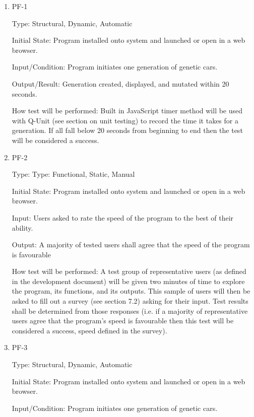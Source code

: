 \documentclass[12pt, titlepage]{article}
\begin{document}
\begin{enumerate}

\item{PF-1\\}

Type: Structural, Dynamic, Automatic
					
Initial State: Program installed onto system and launched or open in a web 
browser.
					
Input/Condition: Program initiates one generation of genetic cars.
					
Output/Result: Generation created, displayed, and mutated within 20 seconds.
					
How test will be performed: Built in JavaScript timer method will be used with 
Q-Unit (see section on unit testing) to record the time it takes for a
generation. If all fall below 20 seconds from beginning to end then the test 
will be considered a success.


\item{PF-2\\}

Type: Type: Functional, Static, Manual
					
Initial State: Program installed onto system and launched or open in a web 
browser.
					
Input: Users asked to rate the speed of the program to the best of their 
ability.
					
Output: A majority of tested users shall agree that the speed of the program is 
favourable
					
 How test will be performed: A test group of representative users (as defined in 
the development document) will be given two minutes of time to explore the 
program, its functions, and its outputs. This sample of users will then be asked 
to fill out a survey (see section 7.2) asking for their input. Test results 
shall be determined from those responses (i.e. if a majority of representative 
users agree that the program's speed is favourable then this test will be 
considered a success, speed defined in the survey).

\item{PF-3\\}

Type: Structural, Dynamic, Automatic
					
Initial State: Program installed onto system and launched or open in a web 
browser.
					
Input/Condition: Program initiates one generation of genetic cars.
					

\end{enumerate}
\end{document}
